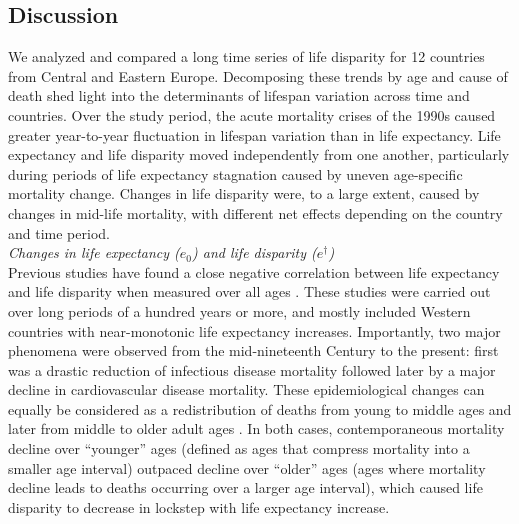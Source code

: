 \documentclass{article}
\begin{document}
\begin{spacing}{1.5}
\section*{Discussion}

We analyzed and compared a long time series of life disparity for 12 countries from Central and Eastern Europe. Decomposing these trends by age and cause of death shed light into the determinants of lifespan variation across time and countries. Over the study period, the acute mortality crises of the 1990s caused greater year-to-year fluctuation in lifespan variation than in life expectancy. Life expectancy and life disparity moved independently from one another, particularly during periods of life expectancy stagnation caused by uneven age-specific mortality change. Changes in life disparity were, to a large extent, caused by changes in mid-life mortality, with different net effects depending on the country and time period. \\

 
\emph{Changes in life expectancy ($e_0$) and life disparity ($e^\dagger$)}\\

Previous studies have found a close negative correlation between life expectancy and life disparity when measured over all ages  \citep{ wilmoth1999,vaupel2011,colchero2016emergence}. These studies were carried out over long periods of a hundred years or more, and mostly included Western countries with near-monotonic life expectancy increases. Importantly, two major phenomena were observed from the mid-nineteenth Century to the present: first was a drastic reduction of infectious disease mortality followed later by a major decline in cardiovascular disease mortality. These epidemiological changes can equally be considered as a redistribution of deaths from young to middle ages and later from middle to older adult ages \citep{robine2001redefining}. In both cases, contemporaneous mortality decline over ``younger'' ages (defined as ages that compress mortality into a smaller age interval) outpaced decline over ``older'' ages (ages where mortality decline leads to deaths occurring over a larger age interval), which caused life disparity to decrease in lockstep with life expectancy increase.\\


\end{spacing}
\end{document}
